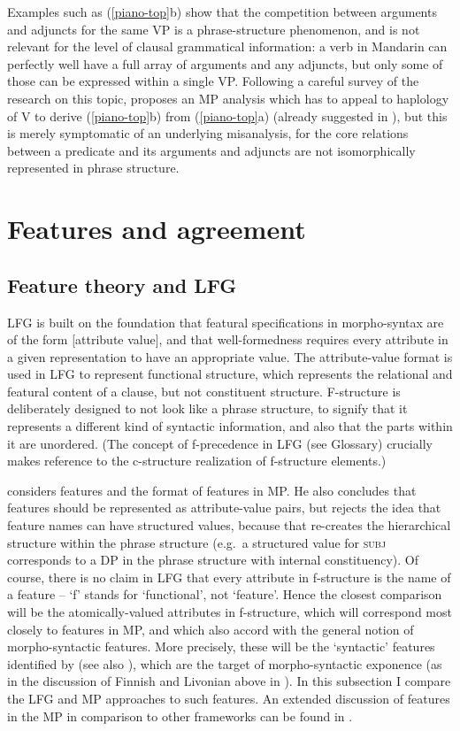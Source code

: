 \documentclass[output=paper,hidelinks]{langscibook}
\begin{document}
Examples such as (\ref{piano-top}b) show that the competition between
arguments and adjuncts for the same VP is a phrase-structure
phenomenon, and is not relevant for the level of clausal grammatical
information: a verb in Mandarin can perfectly well have a full array
of arguments and any adjuncts, but only some of those can be expressed
within a single VP. Following a careful survey of the research on this
topic, \citet{bartos19} proposes an MP analysis which has to appeal to
haplology of V to derive (\ref{piano-top}b) from (\ref{piano-top}a)
(already suggested in \citealp[99]{huang82}), but this is merely
symptomatic of an underlying misanalysis, for the core relations
between a predicate and its arguments and adjuncts are not
isomorphically represented in phrase structure.

\section{Features and agreement}
\label{sec:minimalism:features}

\subsection{Feature theory and LFG}

LFG is built on the foundation that featural specifications in
morpho-syntax are of the form [attribute value], and that
well-formedness requires every attribute in a given representation to
have an appropriate value. The attribute-value format is used in LFG
to represent functional structure, which represents the relational and
featural content of a clause, but not constituent
structure. F-structure is deliberately designed to not look like a
phrase structure, to signify that it represents a different kind of
syntactic information, and also that the parts within it are
unordered. (The concept of f-precedence in LFG (see Glossary)
crucially makes reference to the c-structure realization of
f-structure elements.)

\citet{adger10} considers features and the format of features in
MP. He also concludes that features should be represented as
attribute-value pairs, but rejects the idea that feature names can
have structured values, because that re-creates the hierarchical
structure within the phrase structure (e.g.~a structured value for
\textsc{subj} corresponds to a DP in the phrase structure with
internal constituency). Of course, there is no claim in LFG that
every attribute in f-structure is the name of a feature -- `f' stands
for `functional', not `feature'. Hence the closest comparison will be
the atomically-valued attributes in f-structure, which will correspond
most closely to features in MP, and which also accord with the general
notion of morpho-syntactic features. More precisely, these will be the
`syntactic' features identified by \citet{sadlspen01} (see also
\citealp{spencer13}), which are the target of morpho-syntactic
exponence (as in the discussion of Finnish and Livonian above in
). In this subsection I compare the LFG and
MP approaches to such features. An extended discussion of features in
the MP in comparison to other frameworks can be found in
\citet[409--420]{asudtoiv06}.
\end{document}
